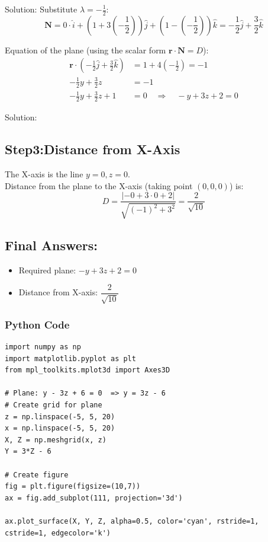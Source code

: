 \documentclass{beamer}
\begin{document}
\begin{frame}{Solution:}
Substitute $\lambda = -\frac{1}{2}$:
\begin{equation}
\mathbf{N}= 0 \cdot \hat{i} + \left(1 + 3\left(-\frac{1}{2}\right)\right)\hat{j} + \left(1 - \left(-\frac{1}{2}\right)\right)\hat{k} 
= -\frac{1}{2}\hat{j} + \frac{3}{2}\hat{k}
\label{eq:normal_final}
\end{equation}

Equation of the plane (using the scalar form $\mathbf{r} \cdot \mathbf{N} = D$):
\begin{align}
\mathbf{r}  \cdot \left(-\frac{1}{2}\hat{j} + \frac{3}{2}\hat{k}\right) &= 1 + 4\left(-\frac{1}{2}\right) = -1 \\
-\frac{1}{2}y + \frac{3}{2}z &= -1 \label{eq:plane_eq1} \\
-\frac{1}{2}y + \frac{3}{2}z + 1 &= 0 \quad \Rightarrow \quad -y + 3z + 2 = 0 \label{eq:plane_eq2}
\end{align}
\end{frame}

\begin{frame}{Solution:}
\subsection*{Step3:Distance from X-Axis}

The X-axis is the line $y=0, z=0$.\\
Distance from the plane to the X-axis (taking point $(0,0,0)$) is:
\begin{equation}
D = \frac{| -0 + 3 \cdot 0 + 2 |}{\sqrt{(-1)^2 + 3^2}} = \frac{2}{\sqrt{10}}
\label{eq:distance}
\end{equation}

\subsection*{Final Answers:}

\begin{itemize}
    \item Required plane: $-y + 3z + 2 = 0$ 
    \item Distance from X-axis: $\dfrac{2}{\sqrt{10}}$
\end{itemize}

\end{frame}



\begin{frame}[fragile]
    \frametitle{Python Code}
    \begin{lstlisting}
import numpy as np
import matplotlib.pyplot as plt
from mpl_toolkits.mplot3d import Axes3D

# Plane: y - 3z + 6 = 0  => y = 3z - 6
# Create grid for plane
z = np.linspace(-5, 5, 20)
x = np.linspace(-5, 5, 20)
X, Z = np.meshgrid(x, z)
Y = 3*Z - 6

# Create figure
fig = plt.figure(figsize=(10,7))
ax = fig.add_subplot(111, projection='3d')

ax.plot_surface(X, Y, Z, alpha=0.5, color='cyan', rstride=1, cstride=1, edgecolor='k')
\end{lstlisting}
\end{frame}
\end{document}
